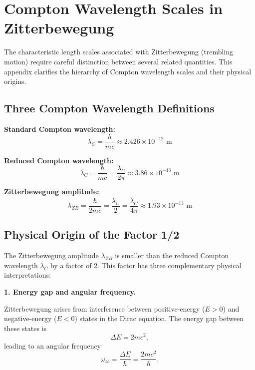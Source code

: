 \documentclass[%
 reprint,
 amsmath,amssymb,
 aps,
 prb,
]{revtex4-2}
\numberwithin{equation}{section}
\begin{document}
\section{Compton Wavelength Scales in Zitterbewegung}
\label{sec:appendix_zb_scales}

The characteristic length scales associated with Zitterbewegung (trembling motion) require careful distinction between several related quantities. This appendix clarifies the hierarchy of Compton wavelength scales and their physical origins.

\subsection{Three Compton Wavelength Definitions}

\noindent\textbf{Standard Compton wavelength:}
\begin{equation}
\lambda_C = \frac{h}{mc} \approx 2.426 \times 10^{-12} \text{ m}
\end{equation}

\noindent\textbf{Reduced Compton wavelength:}
\begin{equation}
\bar{\lambda}_C = \frac{\hbar}{mc} = \frac{\lambda_C}{2\pi} \approx 3.86 \times 10^{-13} \text{ m}
\end{equation}

\noindent\textbf{Zitterbewegung amplitude:}
\begin{equation}
\lambda_{ZB} = \frac{\hbar}{2mc} = \frac{\bar{\lambda}_C}{2} = \frac{\lambda_C}{4\pi} \approx 1.93 \times 10^{-13} \text{ m}
\end{equation}



\subsection{Physical Origin of the Factor 1/2}

The Zitterbewegung amplitude $\lambda_{ZB}$ is smaller than the reduced Compton wavelength $\bar{\lambda}_C$ by a factor of 2. This factor has three complementary physical interpretations:

\medskip
\noindent\textbf{1. Energy gap and angular frequency.}

Zitterbewegung arises from interference between positive-energy ($E > 0$) and negative-energy ($E < 0$) states in the Dirac equation. The energy gap between these states is
\begin{equation}
\Delta E = 2mc^2,
\end{equation}
leading to an angular frequency
\begin{equation}
\omega_{zb} = \frac{\Delta E}{\hbar} = \frac{2mc^2}{\hbar}.
\end{equation}
\end{document}
